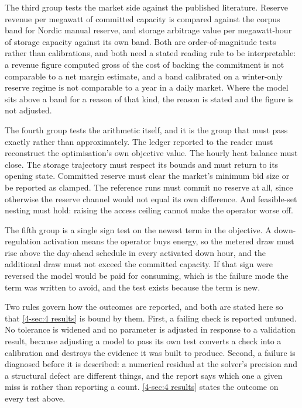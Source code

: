 The third group tests the market side against the published literature. Reserve revenue per megawatt of committed capacity is compared against the corpus band for Nordic manual reserve, and storage arbitrage value per megawatt-hour of storage capacity against its own band. Both are order-of-magnitude tests rather than calibrations, and both need a stated reading rule to be interpretable: a revenue figure computed gross of the cost of backing the commitment is not comparable to a net margin estimate, and a band calibrated on a winter-only reserve regime is not comparable to a year in a daily market. Where the model sits above a band for a reason of that kind, the reason is stated and the figure is not adjusted.

The fourth group tests the arithmetic itself, and it is the group that must pass exactly rather than approximately. The ledger reported to the reader must reconstruct the optimisation's own objective value. The hourly heat balance must close. The storage trajectory must respect its bounds and must return to its opening state. Committed reserve must clear the market's minimum bid size or be reported as clamped. The reference runs must commit no reserve at all, since otherwise the reserve channel would not equal its own difference. And feasible-set nesting must hold: raising the access ceiling cannot make the operator worse off.

The fifth group is a single sign test on the newest term in the objective. A down-regulation activation means the operator buys energy, so the metered draw must rise above the day-ahead schedule in every activated down hour, and the additional draw must not exceed the committed capacity. If that sign were reversed the model would be paid for consuming, which is the failure mode the term was written to avoid, and the test exists because the term is new.

Two rules govern how the outcomes are reported, and both are stated here so that \autoref{4-sec:4 results} is bound by them. First, a failing check is reported untuned. No tolerance is widened and no parameter is adjusted in response to a validation result, because adjusting a model to pass its own test converts a check into a calibration and destroys the evidence it was built to produce. Second, a failure is diagnosed before it is described: a numerical residual at the solver's precision and a structural defect are different things, and the report says which one a given miss is rather than reporting a count. \autoref{4-sec:4 results} states the outcome on every test above.

